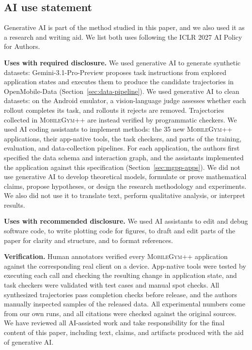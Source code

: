 \subsection*{AI use statement}

Generative AI is part of the method studied in this paper, and we also used it as a research and writing aid. We list both uses following the ICLR 2027 AI Policy for Authors.

\textbf{Uses with required disclosure.}
We used generative AI to generate synthetic datasets: Gemini-3.1-Pro-Preview proposes task instructions from explored application states and executes them to produce the candidate trajectories in OpenMobile-Data (Section~\ref{sec:data-pipeline}).
We used generative AI to clean datasets: on the Android emulator, a vision-language judge assesses whether each rollout completes its task, and rollouts it rejects are removed. Trajectories collected in \textsc{MobileGym++} are instead verified by programmatic checkers.
We used AI coding assistants to implement methods: the 35 new \textsc{MobileGym++} applications, their app-native tools, the task checkers, and parts of the training, evaluation, and data-collection pipelines. For each application, the authors first specified the data schema and interaction graph, and the assistants implemented the application against this specification (Section~\ref{sec:mgpp-apps}).
We did not use generative AI to develop theoretical models, formulate or prove mathematical claims, propose hypotheses, or design the research methodology and experiments. We also did not use it to translate text, perform qualitative analysis, or interpret results.

\textbf{Uses with recommended disclosure.}
We used AI assistants to edit and debug software code, to write plotting code for figures, to draft and edit parts of the paper for clarity and structure, and to format references.

\textbf{Verification.}
Human annotators verified every \textsc{MobileGym++} application against the corresponding real client on a device. App-native tools were tested by executing each call and checking the resulting change in application state, and task checkers were validated with test cases and manual spot checks. All synthesized trajectories pass completion checks before release, and the authors manually inspected samples of the released data. All experimental numbers come from our own runs, and all citations were checked against the original sources. We have reviewed all AI-assisted work and take responsibility for the final content of this paper, including text, claims, and artifacts produced with the aid of generative AI.
